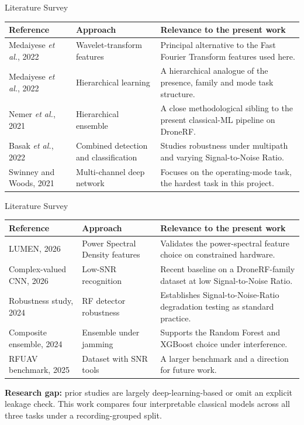 \documentclass[aspectratio=169,11pt]{beamer}
\begin{document}
\begin{frame}{Literature Survey}
\scriptsize
\begin{tabular}{|p{3.0cm}|p{2.9cm}|p{5.6cm}|}
\hline
\textbf{Reference} & \textbf{Approach} & \textbf{Relevance to the present work} \\
\hline
Medaiyese \textit{et al.}, 2022 & Wavelet-transform features &
Principal alternative to the Fast Fourier Transform features used here. \\
\hline
Medaiyese \textit{et al.}, 2022 & Hierarchical learning &
A hierarchical analogue of the presence, family and mode task structure. \\
\hline
Nemer \textit{et al.}, 2021 & Hierarchical ensemble &
A close methodological sibling to the present classical-ML pipeline on DroneRF. \\
\hline
Basak \textit{et al.}, 2022 & Combined detection and classification &
Studies robustness under multipath and varying Signal-to-Noise Ratio. \\
\hline
Swinney and Woods, 2021 & Multi-channel deep network &
Focuses on the operating-mode task, the hardest task in this project. \\
\hline
\end{tabular}
\end{frame}

\begin{frame}{Literature Survey}
\scriptsize
\begin{tabular}{|p{3.0cm}|p{2.9cm}|p{5.6cm}|}
\hline
\textbf{Reference} & \textbf{Approach} & \textbf{Relevance to the present work} \\
\hline
LUMEN, 2026 & Power Spectral Density features &
Validates the power-spectral feature choice on constrained hardware. \\
\hline
Complex-valued CNN, 2026 & Low-SNR recognition &
Recent baseline on a DroneRF-family dataset at low Signal-to-Noise Ratio. \\
\hline
Robustness study, 2024 & RF detector robustness &
Establishes Signal-to-Noise-Ratio degradation testing as standard practice. \\
\hline
Composite ensemble, 2024 & Ensemble under jamming &
Supports the Random Forest and XGBoost choice under interference. \\
\hline
RFUAV benchmark, 2025 & Dataset with SNR tools &
A larger benchmark and a direction for future work. \\
\hline
\end{tabular}
\vspace{0.15cm}

\footnotesize\textbf{Research gap:} prior studies are largely deep-learning-based
or omit an explicit leakage check. This work compares four interpretable
classical models across all three tasks under a recording-grouped split.
\end{frame}
\end{document}
